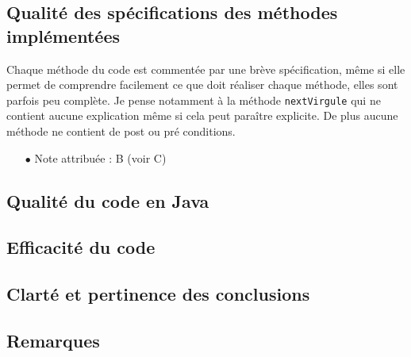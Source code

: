 \documentclass[11pt]{article}
\begin{document}
\subsection{Qualité des spécifications des méthodes implémentées}

Chaque méthode du code est commentée par une brève spécification, même si elle permet de comprendre facilement ce que doit réaliser chaque méthode, elles sont parfois peu complète. Je pense notamment à la méthode \verb+nextVirgule+ qui ne contient aucune explication même si cela peut paraître explicite. De plus aucune méthode ne contient de post ou pré conditions.
\\
\begin{itemize}
\item[$\bullet$] Note attribuée : B (voir C)
\end{itemize}

\subsection{Qualité du code en Java}


\subsection{Efficacité du code}
\subsection{Clarté et pertinence des conclusions}
\subsection{Remarques}
\end{document}
